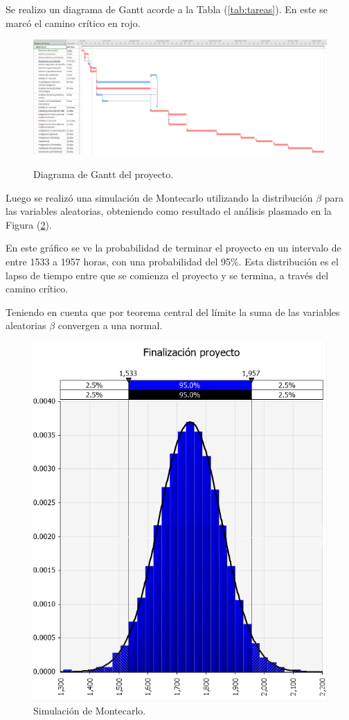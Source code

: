 Se realizo un diagrama de Gantt acorde a la Tabla (\ref{tab:tareas}). En este se marcó el camino crítico en rojo.
\begin{figure}[H]
	\centering
	\includegraphics[width=1\linewidth]{ImagenesFactibilidad/project}
	\label{fig:gantt}
	\caption{Diagrama de Gantt del proyecto.}
\end{figure}

Luego se realizó una simulación de Montecarlo utilizando la distribución $\beta$ para las variables aleatorias, obteniendo como resultado el análisis plasmado en la Figura (\ref{fig:montecarlo_tiempos}).

En este gráfico se ve la probabilidad de terminar el proyecto en un intervalo de entre 1533 a 1957 horas, con una probabilidad del 95\%. Esta distribución es el lapso de tiempo entre que se comienza el proyecto y se termina, a través del camino crítico.

Teniendo en cuenta que por teorema central del límite la suma de las variables aleatorias $\beta$ convergen a una normal.

\begin{figure}[H]
	\centering
	\includegraphics[width=0.5\linewidth]{ImagenesFactibilidad/montecarlo}
	\caption{Simulación de Montecarlo.}	
	\label{fig:montecarlo_tiempos}
\end{figure}


